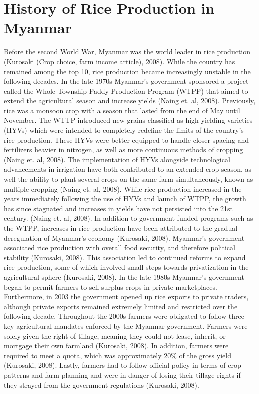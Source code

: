 \documentclass{book}\usepackage{knitr}
\begin{document}
\section{History of Rice Production in Myanmar}
Before the second World War, Myanmar was the world leader in rice production (Kurosaki (Crop choice, farm income article), 2008). While the country has remained among the top 10, rice production became increasingly unstable in the following decades. In the late 1970s Myanmar’s government sponsored a project called the Whole Township Paddy Production Program (WTPP) that aimed to extend the agricultural season and increase yields (Naing et. al, 2008). Previously, rice was a monsoon crop with a season that lasted from the end of May until November. The WTTP introduced new grains classified as high yielding varieties (HYVs) which were intended to completely redefine the limits of the country’s rice production. These HYVs were better equipped to handle closer spacing and fertilizers heavier in nitrogen, as well as more continuous methods of cropping (Naing et. al, 2008).
	The implementation of HYVs alongside technological advancements in irrigation have both contributed to an extended crop season, as well the ability to plant several crops on the same farm simultaneously, known as multiple cropping (Naing et. al, 2008). While rice production increased in the years immediately following the use of HYVs and launch of WTPP, the growth has since stagnated and increases in yields have not persisted into the 21st century. (Naing et. al, 2008).
	In addition to government funded programs such as the WTPP, increases in rice production have been attributed to the gradual deregulation of Myanmar’s economy (Kurosaki, 2008). Myanmar’s government associated rice production with overall food security, and therefore political stability (Kurosaki, 2008). This association led to continued reforms to expand rice production, some of which involved small steps towards privatization in the agricultural sphere (Kurosaki, 2008). In the late 1980s Myanmar’s government began to permit farmers to sell surplus crops in private marketplaces. Furthermore, in 2003 the government opened up rice exports to private traders, although private exports remained extremely limited and restricted over the following decade. 
	Throughout the 2000s farmers were obligated to follow three key agricultural mandates enforced by the Myanmar government. Farmers were solely given the right of tillage, meaning they could not lease, inherit, or mortgage their own farmland (Kurosaki, 2008). In addition, farmers were required to meet a quota, which was approximately 20\% of the gross yield (Kurosaki, 2008). Lastly, farmers had to follow official policy in terms of crop patterns and farm planning and were in danger of losing their tillage rights if they strayed from the government regulations (Kurosaki, 2008).
	
\end{document}
